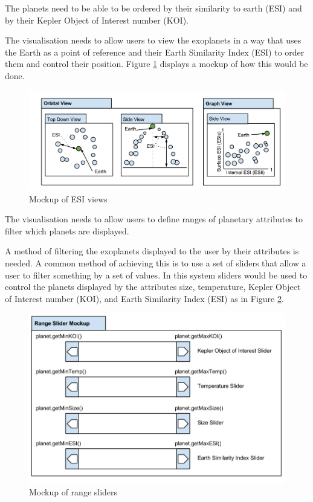 \begin{enumerate}
{\bf
 \item[R3.] The planets need to be able to be ordered by their similarity to
earth (ESI) and by their Kepler Object of Interest number (KOI).}

The visualisation needs to allow users to view the
exoplanets in a way that uses the Earth as a point of reference and their Earth
Similarity Index (ESI) to order them and control their position. Figure \ref{fig:esiMock} displays a mockup of how this would be done.

\begin{figure}[H]
  \centering
      \includegraphics[width=1\textwidth]{images/mockupESI.png}
  \caption{Mockup of ESI views}
  \label{fig:esiMock}
\end{figure}

\clearpage
{\bf
 \item[R4.] The visualisation needs to allow users to define ranges of planetary
attributes to filter which planets are displayed.}

A method of filtering the exoplanets displayed to the user by their attributes is needed. A
common method of achieving this is to use a set of sliders that allow a user to
filter something by a set of values. In this system sliders would
be used to control the planets displayed by the attributes size, temperature, Kepler Object of Interest number (KOI), and Earth Similarity Index (ESI) as in Figure \ref{fig:mockSlider}.
\begin{figure}[H]
  \centering
      \includegraphics[width=.8\textwidth]{images/mockSlider.png}
  \caption{Mockup of range sliders}  
  \label{fig:mockSlider}
\end{figure}


\end{enumerate}

